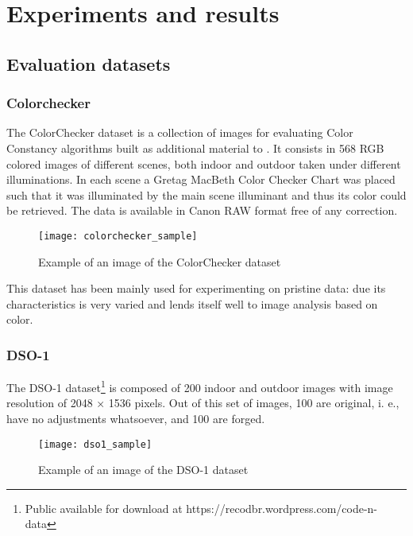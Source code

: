 \chapter{Experiments and results}

\section{Evaluation datasets}

\subsection{Colorchecker}

The ColorChecker dataset is a collection of images for evaluating Color Constancy algorithms built as additional material to \cite{gehler2008bayesian}. It consists in 568 RGB colored images of different scenes, both indoor and outdoor taken under different illuminations. In each scene a Gretag MacBeth Color Checker Chart was placed such that it was illuminated by the main scene illuminant and thus its color could be retrieved. The data is available in Canon RAW format free of any correction.

\begin{figure}[h!]
  \centering
    \texttt{[image: colorchecker\_sample]}
    \caption{Example of an image of the ColorChecker dataset}
    \label{fig:colorcheckersample}
\end{figure}

This dataset has been mainly used for experimenting on pristine data: due its characteristics is very varied and lends itself well to image analysis based on color.

\subsection{DSO-1}

The DSO-1 dataset\footnote{Public available for download at https://recodbr.wordpress.com/code-n-data} is composed of 200 indoor and outdoor images with image resolution of 2048 × 1536 pixels. Out of this set of images, 100 are original, i. e., have no adjustments whatsoever, and 100 are forged. 

\begin{figure}[h!]
  \centering
    \texttt{[image: dso1\_sample]}
    \caption{Example of an image of the DSO-1 dataset}
    \label{fig:dsosample}
\end{figure}

